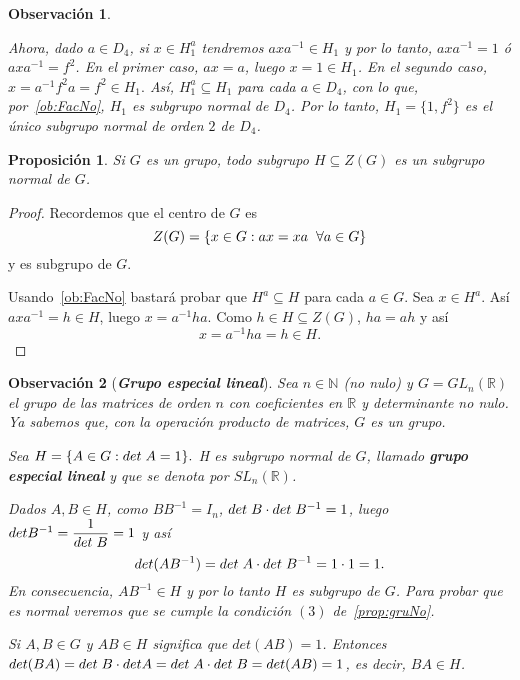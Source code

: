 \documentclass[12pt]{article}
\newtheorem{proposition}[theorem]{Proposición}
\newtheorem{observation}{Observación}[theorem]
\begin{document}
\begin{observation}
\begin{enumerate}
Ahora, dado $a \in D_4$, si $x \in H_1^a$ tendremos $axa^{-1} \in H_1$ y por lo tanto, $axa^{-1} = 1$ ó $axa^{-1} = f^2$. En el primer caso, $ax = a$, luego $x = 1 \in H_1$. En el segundo caso, $x = a^{-1}f^2a = f ^2 \in H_1.$ Así, $H_1^a \subseteq H_1$ para cada $a \in D_4$, con lo que, por~\ref{ob:FacNo}, $H_1$ es subgrupo normal de $D_4$. Por lo tanto, $H_1 = \lbrace 1, f^2 \rbrace$ es el único subgrupo normal de orden $2$ de $D_4$.
\end{enumerate}
\end{observation}

\begin{proposition} Si $G$ es un grupo, todo subgrupo $H \subseteq Z(G)$ es un subgrupo normal de $G$.
\end{proposition}
\begin{proof}
Recordemos que el centro de $G$ es $$Z(G) = \lbrace x \in G : ax = xa \hspace{0.2cm} \forall a \in G\rbrace$$ y es subgrupo de $G$.

Usando~\ref{ob:FacNo} bastará probar que $H^{a}\subseteq H$ para cada $a \in G$. Sea $x \in H^{a}$. Así $axa^{-1} = h \in H$, luego $x = a^{-1}ha$. Como $h \in H \subseteq Z(G)$, $ha = ah$ y así $$x = a^{-1}ha = h \in H.$$

\end{proof}

\begin{observation}[\textbf{\textit{Grupo especial lineal}}] Sea $n \in \mathbb{N}$ (no nulo) y $G = GL_n (\mathbb{R})$ el grupo de las matrices de orden $n$ con coeficientes en $\mathbb{R}$ y determinante no nulo. Ya sabemos que, con la operación producto de matrices, $G$ es un grupo.

Sea $H = \lbrace A \in G: det\hspace{0.1cm} A = 1 \rbrace.$ H es subgrupo normal de $G$, llamado \textbf{grupo especial lineal} y que se denota por $SL_n (\mathbb{R})$.

Dados $A, B \in H$, como $BB^{-1} = I_n$, $det\hspace{0.1cm} B \cdot det\hspace{0.1cm} B^{-1} = 1$, luego $det B^{-1} = \dfrac{1}{det\hspace{0.1cm} B} = 1$ y así $$det(AB^{-1}) = det\hspace{0.1cm} A \cdot det\hspace{0.1cm} B^{-1} = 1 \cdot 1 = 1.$$ En consecuencia, $AB^{-1} \in H$ y por lo tanto $H$ es subgrupo de $G$. Para probar que es normal veremos que se cumple la condición $(3)$ de~\ref{prop:gruNo}.

Si $A,B \in G$ y $AB \in H$ significa que $det(AB) = 1$. Entonces $det (BA) = det \hspace{0.1cm} B \cdot det A = det\hspace{0.1cm} A \cdot det\hspace{0.1cm} B = det(AB) = 1$, es decir, $BA \in H$.

\end{observation}
\end{document}
